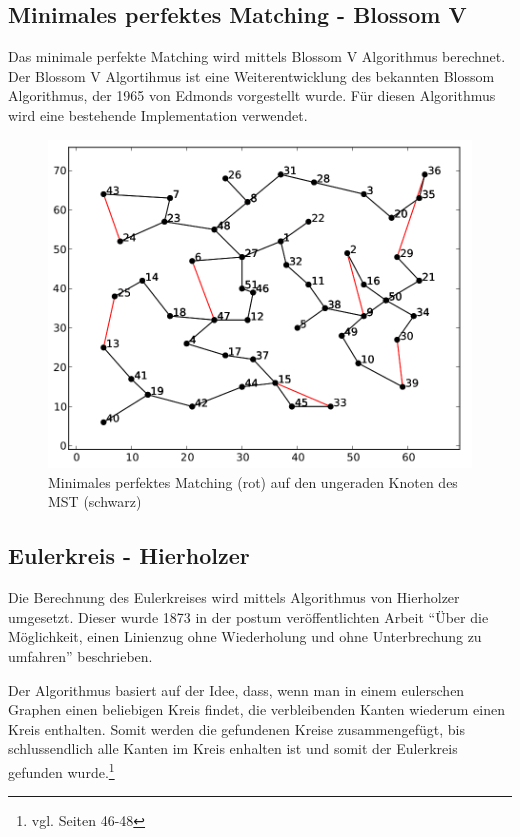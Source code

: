 \documentclass[11pt,a4paper]{article}
\begin{document}
\newpage

\subsection{Minimales perfektes Matching - Blossom V}
Das minimale perfekte Matching wird mittels Blossom V Algorithmus berechnet. Der Blossom V Algortihmus ist eine Weiterentwicklung des bekannten Blossom Algorithmus, der 1965 von Edmonds vorgestellt wurde.
Für diesen Algorithmus wird eine bestehende Implementation verwendet. 

\begin{figure}[H]
        \centering
        \includegraphics[width=12cm]{gfx/eil51_pm}
        \caption{Minimales perfektes Matching (rot) auf den ungeraden Knoten des MST (schwarz)}
        \label{img:eil51_pm}
\end{figure}

\newpage

\subsection{Eulerkreis - Hierholzer}
Die Berechnung des Eulerkreises wird mittels Algorithmus von Hierholzer umgesetzt. Dieser wurde 1873 in der postum veröffentlichten Arbeit "`Über die Möglichkeit, einen Linienzug ohne Wiederholung und ohne Unterbrechung zu umfahren"'\cite{hierholzer73} beschrieben.

Der Algorithmus basiert auf der Idee, dass, wenn man in einem eulerschen Graphen einen beliebigen Kreis findet, die verbleibenden Kanten wiederum einen Kreis enthalten. Somit werden die gefundenen Kreise zusammengefügt, bis schlussendlich alle Kanten im Kreis enhalten ist und somit der Eulerkreis gefunden wurde.\footnote{vgl. \cite{krumke05} Seiten 46-48}
\end{document}

